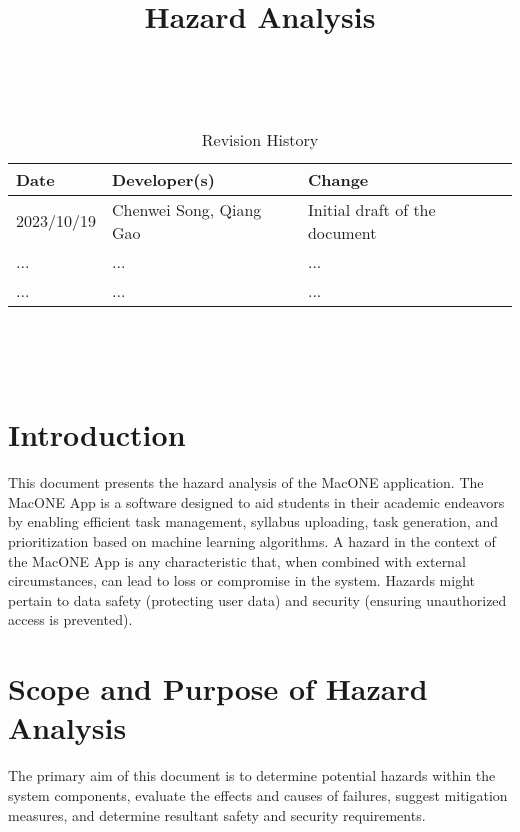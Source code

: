 \documentclass{article}
\title{Hazard Analysis\\\progname}
\author{\authname}
\date{}
\begin{document}
\maketitle
\thispagestyle{empty}

~\newpage


\begin{table}[hp]
\caption{Revision History} \label{TblRevisionHistory}
\begin{tabularx}{\textwidth}{llX}
\toprule
\textbf{Date} & \textbf{Developer(s)} & \textbf{Change}\\
\midrule
2023/10/19 & Chenwei Song, Qiang Gao  & Initial draft of the document\\
... & ... & ...\\
... & ... & ...\\
\bottomrule
\end{tabularx}
\end{table}

~\newpage

\tableofcontents

~\newpage



\section{Introduction}
This document presents the hazard analysis of the MacONE application. The MacONE App is a software designed to aid students in their academic endeavors by enabling efficient task management, syllabus uploading, task generation, and prioritization based on machine learning algorithms.
A hazard in the context of the MacONE App is any characteristic that, when combined with external circumstances, can lead to loss or compromise in the system. Hazards might pertain to data safety (protecting user data) and security (ensuring unauthorized access is prevented).

\section{Scope and Purpose of Hazard Analysis}
The primary aim of this document is to determine potential hazards within the system components, evaluate the effects and causes of failures, suggest mitigation measures, and determine resultant safety and security requirements.
\end{document}
